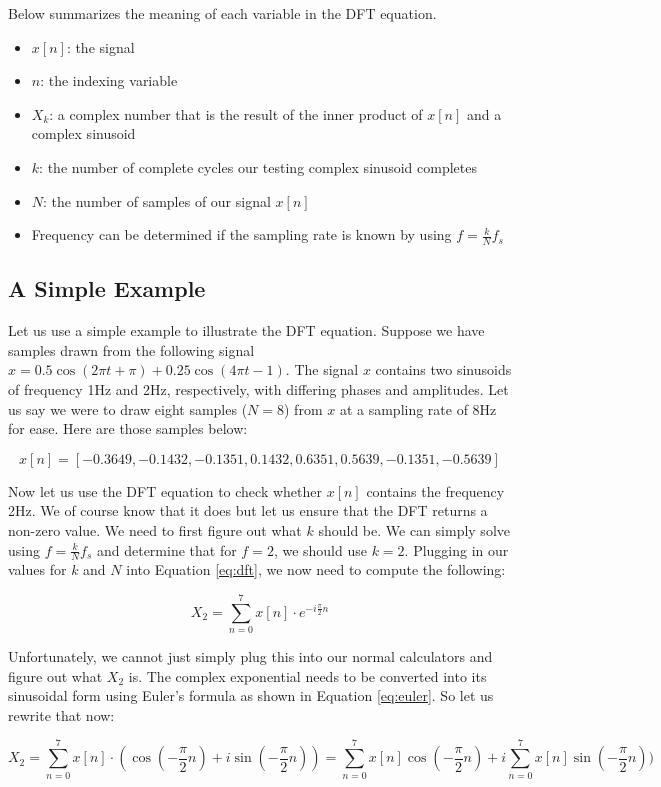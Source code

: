 Below summarizes the meaning of each variable in the DFT equation.

\begin{itemize}
	\item $x[n]$: the signal
	\item $n$: the indexing variable
	\item $X_k$: a complex number that is the result of the inner product of $x[n]$ and a complex sinusoid
	\item $k$: the number of complete cycles our testing complex sinusoid completes
	\item $N$: the number of samples of our signal $x[n]$
	\item Frequency can be determined if the sampling rate is known by using $f = \frac{k}{N}f_s$
\end{itemize}

\subsection*{A Simple Example}

Let us use a simple example to illustrate the DFT equation.  Suppose
we have samples drawn from the following signal $x = 0.5\cos(2\pi t + \pi) + 0.25\cos(4\pi t - 1)$.  The signal
$x$ contains two sinusoids of frequency 1Hz and 2Hz, respectively, with differing phases and amplitudes.  
Let us say we
were to draw eight samples ($N = 8$) from $x$ at a sampling rate of 8Hz for ease.  Here are those samples below:

$$x[n] = [-0.3649, -0.1432, -0.1351, 0.1432, 0.6351, 0.5639, -0.1351, -0.5639]$$

Now let us use the DFT equation to check whether $x[n]$ contains the frequency 2Hz.  We 
of course know that it does but let us ensure that the DFT returns a non-zero value.  We
need to first figure out what $k$ should be.  We can simply solve using $f = \frac{k}{N}f_s$ and determine that
for $f = 2$, we should use $k = 2$.  Plugging in our values for $k$ and $N$ into Equation \ref{eq:dft}, we now 
need to compute the following:

$$X_2 = \sum_{n = 0}^{7}x[n] \cdot e^{-i\frac{\pi}{2}n}$$

\noindent Unfortunately, we cannot just simply plug this into our normal calculators and figure out what $X_2$ is.  The complex exponential needs to be converted into its sinusoidal form using Euler's formula as shown in Equation
 \ref{eq:euler}.  So let us rewrite that now:

$$X_2 = \sum_{n = 0}^{7}x[n] \cdot (\cos{(-\frac{\pi}{2}n)} +  i\sin(-\frac{\pi}{2}n)) = 
\sum_{n = 0}^{7}x[n]\cos{(-\frac{\pi}{2}n)} + i\sum_{n = 0}^{7}x[n]\sin(-\frac{\pi}{2}n))$$

